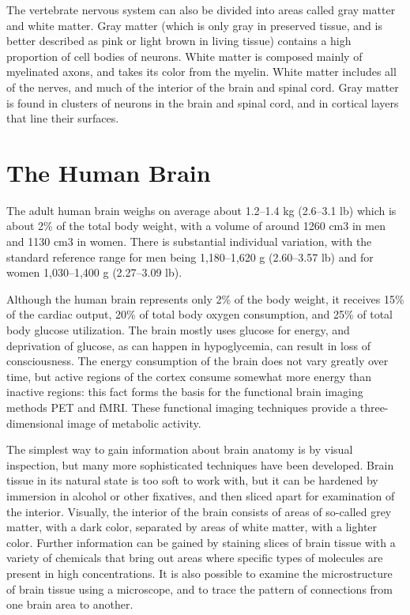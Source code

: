 The vertebrate nervous system can also be divided into areas called gray matter and white matter. Gray matter (which is only gray in preserved tissue, and is better described as pink or light brown in living tissue) contains a high proportion of cell bodies of neurons. White matter is composed mainly of myelinated axons, and takes its color from the myelin. White matter includes all of the nerves, and much of the interior of the brain and spinal cord. Gray matter is found in clusters of neurons in the brain and spinal cord, and in cortical layers that line their surfaces.

\hypertarget{the-human-brain}{%
\section{The Human Brain}\label{the-human-brain}}

The adult human brain weighs on average about 1.2--1.4 kg (2.6--3.1 lb) which is about 2\% of the total body weight, with a volume of around 1260 cm3 in men and 1130 cm3 in women. There is substantial individual variation, with the standard reference range for men being 1,180--1,620 g (2.60--3.57 lb) and for women 1,030--1,400 g (2.27--3.09 lb).

Although the human brain represents only 2\% of the body weight, it receives 15\% of the cardiac output, 20\% of total body oxygen consumption, and 25\% of total body glucose utilization. The brain mostly uses glucose for energy, and deprivation of glucose, as can happen in hypoglycemia, can result in loss of consciousness. The energy consumption of the brain does not vary greatly over time, but active regions of the cortex consume somewhat more energy than inactive regions: this fact forms the basis for the functional brain imaging methods PET and fMRI. These functional imaging techniques provide a three-dimensional image of metabolic activity.

The simplest way to gain information about brain anatomy is by visual inspection, but many more sophisticated techniques have been developed. Brain tissue in its natural state is too soft to work with, but it can be hardened by immersion in alcohol or other fixatives, and then sliced apart for examination of the interior. Visually, the interior of the brain consists of areas of so-called grey matter, with a dark color, separated by areas of white matter, with a lighter color. Further information can be gained by staining slices of brain tissue with a variety of chemicals that bring out areas where specific types of molecules are present in high concentrations. It is also possible to examine the microstructure of brain tissue using a microscope, and to trace the pattern of connections from one brain area to another.

